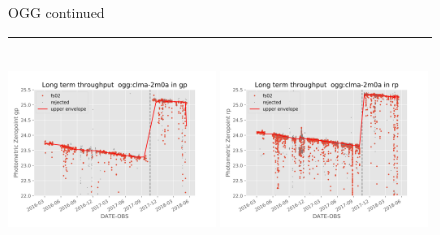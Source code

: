 \documentclass[draft]{spieman}
\begin{document}
\begin{figure}\ContinuedFloat
\centering 
OGG continued \\ 
\rule{\textwidth}{0.4pt} \\
\includegraphics[width=0.49\textwidth]{images/photzptrend-ogg-clma-2m0a-gp.png} \hspace*{\fill}
\includegraphics[width=0.49\textwidth]{images/photzptrend-ogg-clma-2m0a-rp.png} \\[1ex]


\end{figure}
\end{document}
